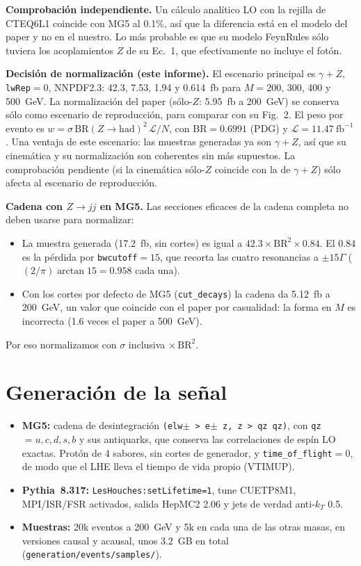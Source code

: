 \documentclass[11pt,a4paper]{article}
\newcommand{\obs}[1]{\par\smallskip\noindent\colorbox{orange!12}{\parbox{\dimexpr\linewidth-2\fboxsep}{\small #1}}\par\smallskip}
\begin{document}
\textbf{Comprobación independiente.} Un cálculo analítico LO con la rejilla de CTEQ6L1 coincide con MG5 al 0.1\%, así que la diferencia está en el modelo del paper y no en el nuestro. Lo más probable es que su modelo FeynRules sólo tuviera los acoplamientos $Z$ de su Ec.~1, que efectivamente no incluye el fotón.

\obs{\textbf{Decisión de normalización (este informe).} El escenario principal es \textbf{$\gamma+Z$}, \texttt{lwRep}$=0$, NNPDF2.3: 42.3, 7.53, 1.94 y 0.614~fb para $M=200$, 300, 400 y 500~GeV. La normalización del paper (sólo-$Z$: 5.95~fb a 200~GeV) se conserva sólo como escenario de reproducción, para comparar con su Fig.~2.
El peso por evento es $w=\sigma\,\mathrm{BR}(Z\to\mathrm{had})^2\,\mathcal{L}/N$, con $\mathrm{BR}=0.6991$ (PDG) y $\mathcal{L}=11.47~\mathrm{fb}^{-1}$.
Una ventaja de este escenario: las muestras generadas ya son $\gamma+Z$, así que su cinemática y su normalización son coherentes sin más supuestos. La comprobación pendiente (si la cinemática sólo-$Z$ coincide con la de $\gamma+Z$) sólo afecta al escenario de reproducción.}

\obs{\textbf{Cadena con $Z\to jj$ en MG5.} Las secciones eficaces de la cadena completa no deben usarse para normalizar:
\begin{itemize}
\item La muestra generada (17.2~fb, sin cortes) es igual a $42.3\times\mathrm{BR}^2\times0.84$. El 0.84 es la pérdida por \texttt{bwcutoff}$=15$, que recorta las cuatro resonancias a $\pm15\Gamma$ ($(2/\pi)\arctan15=0.958$ cada una).
\item Con los cortes por defecto de MG5 (\texttt{cut\_decays}) la cadena da 5.12~fb a 200~GeV, un valor que coincide con el paper por casualidad: la forma en $M$ es incorrecta (1.6 veces el paper a 500~GeV).
\end{itemize}
Por eso normalizamos con $\sigma$ inclusiva $\times\,\mathrm{BR}^2$.}

\section{Generación de la señal}
\begin{itemize}
\item \textbf{MG5:} cadena de desintegración \texttt{(elw$\pm$ > e$\pm$ z, z > qz qz)}, con \texttt{qz} $=u,c,d,s,b$ y sus antiquarks, que conserva las correlaciones de espín LO exactas. Protón de 4 sabores, sin cortes de generador, y \texttt{time\_of\_flight}$=0$, de modo que el LHE lleva el tiempo de vida propio (VTIMUP).
\item \textbf{Pythia~8.317:} \texttt{LesHouches:setLifetime=1}, tune CUETP8M1, MPI/ISR/FSR activados, salida HepMC2 2.06 y jets de verdad anti-$k_T$ 0.5.
\item \textbf{Muestras:} 20k eventos a 200~GeV y 5k en cada una de las otras masas, en versiones causal y acausal, unos 3.2~GB en total (\texttt{generation/events/samples/}).
\end{itemize}
\end{document}
